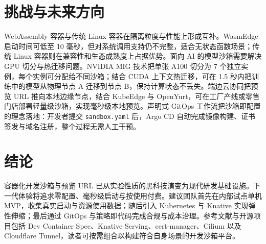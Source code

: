 \chapter{挑战与未来方向}
WebAssembly 容器与传统 Linux 容器在隔离粒度与性能上形成互补。WasmEdge 启动时间可低至 10 毫秒，但对系统调用支持仍不完整，适合无状态函数场景；传统 Linux 容器则在兼容性和生态成熟度上占据优势。面向 AI 的模型沙箱需要解决 GPU 切分与热迁移问题。NVIDIA MIG 技术把单张 A100 切分为 7 个独立实例，每个实例可分配给不同沙箱；结合 CUDA 上下文热迁移，可在 1.5 秒内把训练中的模型从物理节点 A 迁移到节点 B，保持计算状态不丢失。端边云协同把预览 URL 推向本地边缘节点，结合 KubeEdge 与 OpenYurt，可在工厂产线或零售门店部署轻量级沙箱，实现毫秒级本地预览。声明式 GitOps 工作流把沙箱即配置的理念落地：开发者提交 \texttt{sandbox.yaml} 后，Argo CD 自动完成镜像构建、证书签发与域名注册，整个过程无需人工干预。\par
\chapter{结论}
容器化开发沙箱与预览 URL 已从实验性质的黑科技演变为现代研发基础设施。下一代体验将追求零配置、毫秒级启动与按使用付费。建议团队首先在内部试点单机 MVP，收集真实启动与资源使用数据；随后引入 Kubernetes 与 Knative 实现弹性伸缩；最后通过 GitOps 与策略即代码完成合规与成本治理。参考文献与开源项目包括 Dev Container Spec、Knative Serving、cert-manager、Cilium 以及 Cloudflare Tunnel，读者可按需组合以构建符合自身场景的开发沙箱平台。\par
